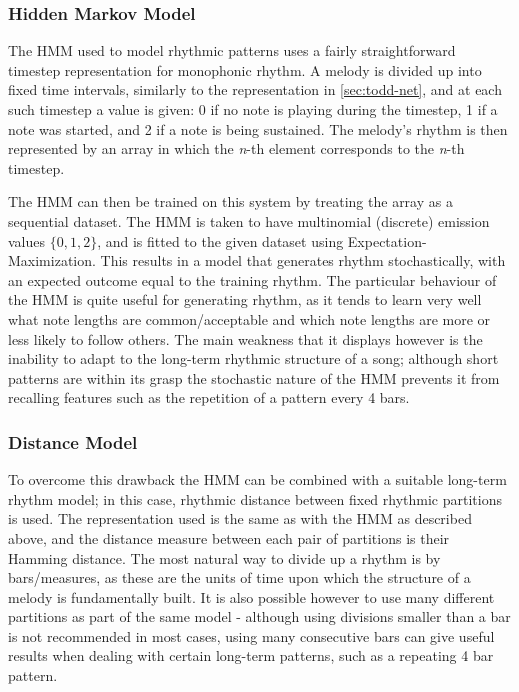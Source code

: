 \documentclass[ author={Stephen Livermore-Tozer},
				supervisor={Dr. Peter Flach},
				degree={MEng},
				title={Algorithmic Co-composition Using Machine Learning},
				subtitle={},
				type={research},
				year={2016} ]{dissertation}
\begin{document}
	\subsubsection{Hidden Markov Model}
	
	The HMM used to model rhythmic patterns uses a fairly straightforward timestep representation for monophonic rhythm. A melody is divided up into fixed time intervals, similarly to the representation in \ref{sec:todd-net}, and at each such timestep a value is given: 0 if no note is playing during the timestep, 1 if a note was started, and 2 if a note is being sustained. The melody's rhythm is then represented by an array in which the \textit{n}-th element corresponds to the \textit{n}-th timestep.
	
	The HMM can then be trained on this system by treating the array as a sequential dataset. The HMM is taken to have multinomial (discrete) emission values $\{0,1,2\}$, and is fitted to the given dataset using Expectation-Maximization. This results in a model that generates rhythm stochastically, with an expected outcome equal to the training rhythm. The particular behaviour of the HMM is quite useful for generating rhythm, as it tends to learn very well what note lengths are common/acceptable and which note lengths are more or less likely to follow others. The main weakness that it displays however is the inability to adapt to the long-term rhythmic structure of a song; although short patterns are within its grasp the stochastic nature of the HMM prevents it from recalling features such as the repetition of a pattern every 4 bars. 
	
	\subsubsection{Distance Model}
	
	To overcome this drawback the HMM can be combined with a suitable long-term rhythm model; in this case, rhythmic distance between fixed rhythmic partitions is used. The representation used is the same as with the HMM as described above, and the distance measure between each pair of partitions is their Hamming distance. The most natural way to divide up a rhythm is by bars/measures, as these are the units of time upon which the structure of a melody is fundamentally built. It is also possible however to use many different partitions as part of the same model - although using divisions smaller than a bar is not recommended in most cases, using many consecutive bars can give useful results when dealing with certain long-term patterns, such as a repeating 4 bar pattern.
	
\end{document}

